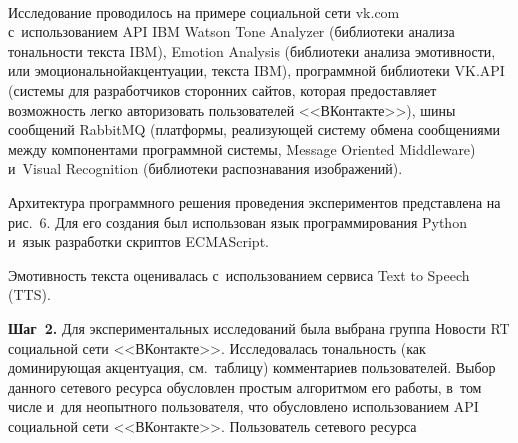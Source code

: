 \begin{figure*}[h] %
\vspace*{-6pt}
\begin{center}
\mbox{%
\epsfxsize=154.849mm
}
\end{center}
\vspace*{-11pt}
\vspace*{-6pt}
\end{figure*}

\begin{multicols}{2}


 
  Исследование проводилось на примере социальной сети {\sf vk.com} 
с~использованием API IBM Watson Tone Analyzer (библиотеки анализа 
тональности текста IBM), Emotion Analysis (библиотеки анализа эмотивности, 
или эмоциональной\linebreak акцентуации, текста IBM), программной библиотеки 
VK.API (сис\-те\-мы для разработчиков сторонних сайтов, которая предоставляет 
возможность легко авторизовать пользователей <<ВКонтакте>>), шины 
сообщений RabbitMQ (платформы, реализующей систему обмена сообщениями 
между компонентами программной системы, Message Oriented Middleware) 
и~Visual Recognition (библиотеки распознавания изображений). 
  
  Архитектура программного решения проведения экспериментов 
представлена на рис.~6. Для его создания был использован язык 
программирования Python и~язык разработки скриптов ECMAScript.
  
  Эмотивность текста оценивалась с~использованием сервиса Text to Speech 
(TTS). 

\bigskip

  \noindent
  \textbf{Шаг~2.} Для экспериментальных исследований была выбрана группа 
Новости RT социальной сети <<ВКонтакте>>. Исследовалась тональность (как 
доминирующая акцентуация, см.\ таблицу) комментариев пользователей. 
Выбор данного сетевого ресурса обусловлен простым алгоритмом его работы, 
в~том числе и~для неопытного пользователя, что обусловлено использованием 
API социальной сети <<ВКонтакте>>. Пользователь сетевого ресурса\linebreak\vspace*{-12pt}

 { \begin{center}  %
 \vspace*{24pt}
 \mbox{%
\epsfxsize=78mm
}


\end{center}}
\end{multicols}
